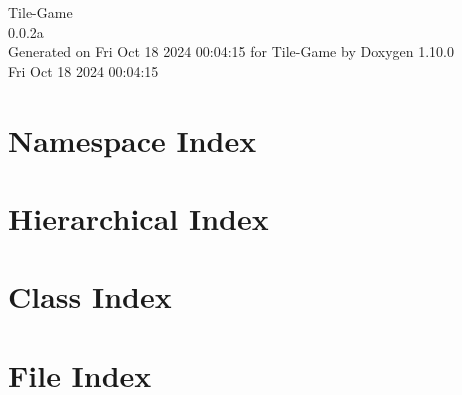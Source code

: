\documentclass[twoside]{book}
\newcommand{\+}{\discretionary{\mbox{\scriptsize$\hookleftarrow$}}{}{}}
\newcommand{\clearemptydoublepage}{%
    \newpage{\pagestyle{empty}\cleardoublepage}%
  }
\begin{document}
  \raggedbottom
    \hypersetup{pageanchor=false,
                bookmarksnumbered=true,
                pdfencoding=unicode
               }
  \begin{titlepage}
  \vspace*{7cm}
  \begin{center}%
  {\Large Tile-\/\+Game}\\
  [1ex]\large 0.\+0.\+2a \\
  \vspace*{1cm}
  {\large Generated on Fri Oct 18 2024 00\+:04\+:15 for Tile-\/\+Game by Doxygen 1.10.0}\\
    \vspace*{0.5cm}
    {\small Fri Oct 18 2024 00:04:15}
  \end{center}
  \end{titlepage}
  \clearemptydoublepage
  \tableofcontents
  \clearemptydoublepage
  \hypersetup{pageanchor=true}
\chapter{Namespace Index}

\chapter{Hierarchical Index}

\chapter{Class Index}

\chapter{File Index}

\end{document}
